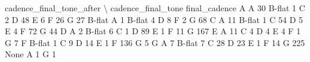 \documentclass[letterpaper,10pt,english]{sphinxmanual}
\begin{document}
{\begin{sphinxVerbatim}[commandchars=\\\{\}]
                                  cadence\_final\_tone\_after  \textbackslash{}
cadence\_final\_tone final\_cadence
A                  A                                    30
                   B-flat                                1
                   C                                     2
                   D                                    48
                   E                                     6
                   F                                    26
                   G                                    27
B-flat             A                                     1
                   B-flat                                4
                   D                                     8
                   F                                     2
                   G                                    68
C                  A                                    11
                   B-flat                                1
                   C                                    54
                   D                                     5
                   E                                     4
                   F                                    72
                   G                                    44
D                  A                                     2
                   B-flat                                6
                   C                                     1
                   D                                    89
                   E                                     1
                   F                                    11
                   G                                   167
E                  A                                    11
                   C                                     4
                   D                                     4
                   E                                     4
                   F                                     1
                   G                                     7
F                  B-flat                                1
                   C                                     9
                   D                                    14
                   E                                     1
                   F                                   136
                   G                                     5
G                  A                                     7
                   B-flat                                7
                   C                                    28
                   D                                    23
                   E                                     1
                   F                                    14
                   G                                   225
None               A                                     1
                   G                                     1


\end{sphinxVerbatim}}
\end{document}
